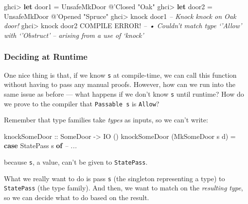 \documentclass[]{article}
\newenvironment{Shaded}{}{}
\newcommand{\CommentTok}[1]{\textcolor[rgb]{0.38,0.63,0.69}{\textit{#1}}}
\newcommand{\DataTypeTok}[1]{\textcolor[rgb]{0.56,0.13,0.00}{#1}}
\newcommand{\FunctionTok}[1]{\textcolor[rgb]{0.02,0.16,0.49}{#1}}
\newcommand{\KeywordTok}[1]{\textcolor[rgb]{0.00,0.44,0.13}{\textbf{#1}}}
\newcommand{\NormalTok}[1]{#1}
\newcommand{\OtherTok}[1]{\textcolor[rgb]{0.00,0.44,0.13}{#1}}
\newcommand{\StringTok}[1]{\textcolor[rgb]{0.25,0.44,0.63}{#1}}
\begin{document}
\begin{Shaded}
\begin{Highlighting}[]
\NormalTok{ghci}\FunctionTok{>} \KeywordTok{let}\NormalTok{ door1 }\FunctionTok{=} \DataTypeTok{UnsafeMkDoor} \FunctionTok{@}\NormalTok{'}\DataTypeTok{Closed} \StringTok{"Oak"}
\NormalTok{ghci}\FunctionTok{>} \KeywordTok{let}\NormalTok{ door2 }\FunctionTok{=} \DataTypeTok{UnsafeMkDoor} \FunctionTok{@}\NormalTok{'}\DataTypeTok{Opened} \StringTok{"Spruce"}
\NormalTok{ghci}\FunctionTok{>}\NormalTok{ knock door1}
\CommentTok{-- Knock knock on Oak door!}
\NormalTok{ghci}\FunctionTok{>}\NormalTok{ knock door2}
\DataTypeTok{COMPILE} \DataTypeTok{ERROR}\FunctionTok{!}
\CommentTok{--     • Couldn't match type ‘'Allow’ with ‘'Obstruct’}
\CommentTok{--             arising from a use of ‘knock’}
\end{Highlighting}
\end{Shaded}

\hypertarget{deciding-at-runtime}{%
\subsubsection{Deciding at Runtime}\label{deciding-at-runtime}}

One nice thing is that, if we know \texttt{s} at compile-time, we can call this
function without having to pass any manual proofs. However, how can we run into
the same issue as before --- what happens if we don't know \texttt{s} until
runtime? How do we prove to the compiler that \texttt{Passable\ s} is
\texttt{\textquotesingle{}Allow}?

Remember that type families take \emph{types} as inputs, so we can't write:

\begin{Shaded}
\begin{Highlighting}[]
\OtherTok{knockSomeDoor ::} \DataTypeTok{SomeDoor} \OtherTok{->} \DataTypeTok{IO}\NormalTok{ ()}
\NormalTok{knockSomeDoor (}\DataTypeTok{MkSomeDoor}\NormalTok{ s d) }\FunctionTok{=} \KeywordTok{case} \DataTypeTok{StatePass}\NormalTok{ s }\KeywordTok{of}
                                  \CommentTok{-- ...}
\end{Highlighting}
\end{Shaded}

because \texttt{s}, a value, can't be given to \texttt{StatePass}.

What we really want to do is pass \texttt{s} (the singleton representing a type)
to \texttt{StatePass} (the type family). And then, we want to match on the
\emph{resulting type}, so we can decide what to do based on the result.
\end{document}
